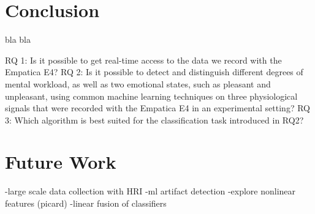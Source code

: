 

\section{Conclusion}
bla bla

RQ 1: Is it possible to get real-time access to the data we record with the Empatica E4?
RQ 2: Is it possible to detect and distinguish different degrees of mental workload, as well as two emotional states, such as pleasant and unpleasant, using common machine learning techniques on three physiological signals that were recorded with the Empatica E4 in an experimental setting?
RQ 3: Which algorithm is best suited for the classification task introduced in RQ2?
\section{Future Work}
-large scale data collection with HRI
-ml artifact detection
-explore nonlinear features (picard)
-linear fusion of classifiers
